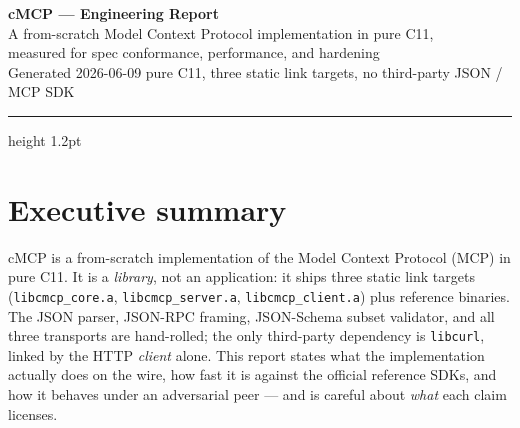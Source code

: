 \documentclass[10pt]{article}
\newcommand{\code}[1]{\texttt{\small #1}}
\begin{document}
\begin{center}
  {\LARGE\bfseries cMCP --- Engineering Report}\\[4pt]
  {\normalsize A from-scratch Model Context Protocol implementation in pure C11,\\
   measured for spec conformance, performance, and hardening}\\[6pt]
  {\small\color{rulegrey} Generated 2026-06-09 \quad\textbullet\quad
   pure C11, three static link targets, no third-party JSON / MCP SDK}
\end{center}
\vspace{-2pt}
{\color{secblue}\hrule height 1.2pt}
\vspace{6pt}

\section{Executive summary}

cMCP is a from-scratch implementation of the Model Context Protocol (MCP) in
pure C11. It is a \emph{library}, not an application: it ships three static
link targets (\code{libcmcp\_core.a}, \code{libcmcp\_server.a},
\code{libcmcp\_client.a}) plus reference binaries. The JSON parser, JSON-RPC
framing, JSON-Schema subset validator, and all three transports are
hand-rolled; the only third-party dependency is \code{libcurl}, linked by the
HTTP \emph{client} alone. This report states what the implementation actually
does on the wire, how fast it is against the official reference SDKs, and how
it behaves under an adversarial peer --- and is careful about \emph{what} each
claim licenses.
\end{document}
